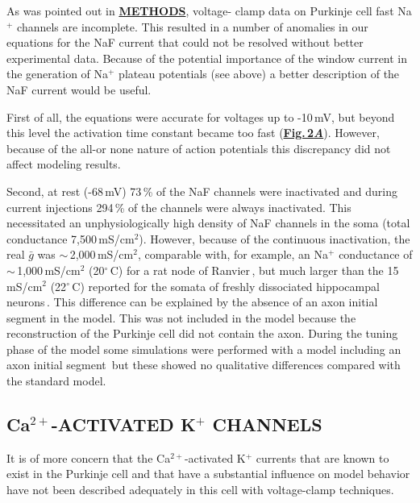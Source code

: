 \documentclass[12pt]{article}
\begin{document}
As was pointed out in \href{../pub-purkinje-deschutter1-conductance1-naf/pub-purkinje-deschutter1-conductance1-naf.tex}{\bf METHODS}, voltage-
clamp data on Purkinje cell fast Na$^+$ channels are incomplete.
This resulted in a number of anomalies in our
equations for the NaF current that could not be resolved
without better experimental data. Because of the potential
importance of the window current in the generation of Na$^+$
plateau potentials (see above) a better description of the
NaF current would be useful.

First of all, the equations were accurate for voltages up to
-10\,mV, but beyond this level the activation time constant
became too fast (\href{../pub-purkinje-deschutter1-conductance1-naf/pub-purkinje-deschutter1-conductance1-naf.tex}{\bf Fig.\,2{\it A}}). However, because of the all-or none
nature of action potentials this discrepancy did not
affect modeling results.

Second, at rest (-68\,mV) 73\,\% of the NaF channels were
inactivated and during current injections 294\,\% of the
channels were always inactivated. This necessitated an unphysiologically
high density of NaF channels in the soma
(total conductance 7,500\,mS/cm$^2$). However, because of
the continuous inactivation, the real $\bar g$ was $\sim$\,2,000\,mS/cm$^2$, 
comparable with, for example, an Na$^+$ conductance
of $\sim$\,1,000\,mS/cm$^2$ (20$^\circ$\,C) for a rat node of 
Ranvier\,\cite{Neumcke:1982qa}, but much larger than the
15\,mS/cm$^2$ (22$^\circ$\,C) reported for the somata of freshly dissociated
hippocampal neurons\,\cite{Sah:1988fv}. This difference
can be explained by the absence of an axon initial
segment in the model. This was not included in the model
because the reconstruction of the Purkinje cell did not contain
the axon. During the tuning phase of the model some
simulations were performed with a model including an
axon initial segment\,\cite{Somogyi:1976dz} but
these showed no qualitative differences compared with the
standard model.

\subsection*{Ca$^{2+}$-ACTIVATED K$^+$ CHANNELS}

It is of more concern that
the Ca$^{2+}$-activated K$^+$ currents that are known to exist in
the Purkinje cell and that have a substantial influence on
model behavior have not been described adequately in this
cell with voltage-clamp techniques.
\end{document}
